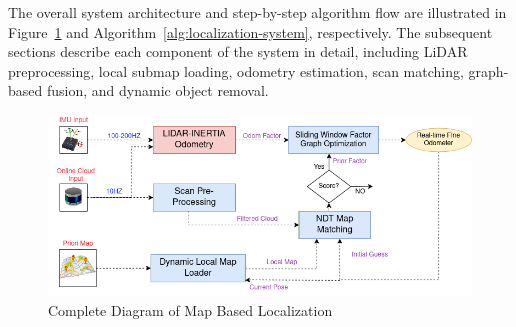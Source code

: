 The overall system architecture and step-by-step algorithm flow are illustrated in Figure~\ref{fig:diagram-map-basedlocalization} and Algorithm~\ref{alg:localization-system}, respectively. The subsequent sections describe each component of the system in detail, including LiDAR preprocessing, local submap loading, odometry estimation, scan matching, graph-based fusion, and dynamic object removal.



%	
%	
%	
%	
%	
%	

\begin{figure}
    \centering
    \includegraphics[width=1\linewidth]{images/system-overview.png}
    \caption{Complete Diagram of Map Based Localization}
    \label{fig:diagram-map-basedlocalization}
\end{figure}


